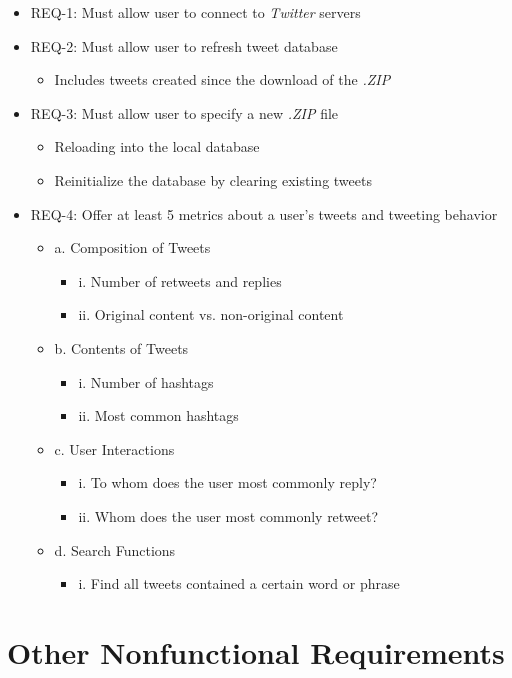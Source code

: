 \documentclass[a4paper, 12pt]{article}
\begin{document}
\begin{itemize}
\item REQ-1: Must allow user to connect to \textit{Twitter} servers
\item REQ-2: Must allow user to refresh tweet database
\begin{itemize}
\item Includes tweets created since the download of the \textit{.ZIP}
\end{itemize}
\item REQ-3: Must allow user to specify a new \textit{.ZIP} file
\begin{itemize}
\item Reloading into the local database
\item Reinitialize the database by clearing existing tweets
\end{itemize}
\item REQ-4: Offer at least 5 metrics about a user's tweets and tweeting behavior
\begin {itemize} 
\item a. Composition of Tweets
\begin{itemize}
\item i. Number of retweets and replies
\item ii. Original content vs. non-original content
\end{itemize}
\item b. Contents of Tweets
\begin{itemize}
\item i. Number of hashtags
\item ii. Most common hashtags
\end{itemize}
\item c. User Interactions
\begin{itemize}
\item i. To whom does the user most commonly reply?
\item ii. Whom does the user most commonly retweet?
\end{itemize}
\item d. Search Functions
\begin{itemize}
\item i. Find all tweets contained a certain word or phrase
\end{itemize}
\end{itemize}
\end{itemize}

\section{Other Nonfunctional Requirements} \label{sec:othernonfunc}
\end{document}
